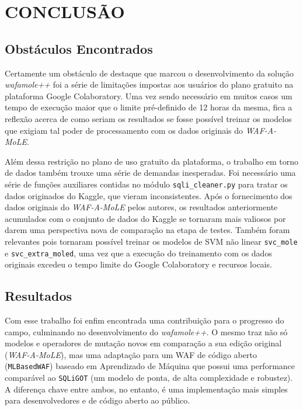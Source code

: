 \chapter{CONCLUSÃO}
\label{chp:capitulo6}

\section{Obstáculos Encontrados}

Certamente um obstáculo de destaque que marcou o desenvolvimento da solução \textit{wafamole++} foi a série de limitações impostas aos usuários do plano gratuito na plataforma Google Colaboratory. Uma vez sendo necessário em muitos casos um tempo de execução maior que o limite pré-definido de 12 horas da mesma, fica a reflexão acerca de como seriam os resultados se fosse possível treinar os modelos que exigiam tal poder de processamento com os dados originais do \textit{WAF-A-MoLE}.

Além dessa restrição no plano de uso gratuito da plataforma, o trabalho em torno de dados também trouxe uma série de demandas inesperadas. Foi necessário uma série de funções auxiliares contidas no módulo \verb+sqli_cleaner.py+ para tratar os dados originados do Kaggle, que vieram inconsistentes. Após o fornecimento dos dados originais do \textit{WAF-A-MoLE} pelos autores, os resultados anteriormente acumulados com o conjunto de dados do Kaggle se tornaram mais valiosos por darem uma perspectiva nova de comparação na etapa de testes. Também foram relevantes pois tornaram possível treinar os modelos de SVM não linear \verb+svc_mole+ e \verb+svc_extra_moled+, uma vez que a execução do treinamento com os dados originais excedeu o tempo limite do Google Colaboratory e recursos locais.

\section{Resultados}

Com esse trabalho foi enfim encontrada uma contribuição para o progresso do campo, culminando no desenvolvimento do \textit{wafamole++}. O mesmo traz não só modelos e operadores de mutação novos em comparação a sua edição original (\textit{WAF-A-MoLE}), mas uma adaptação para um WAF de código aberto (\verb+MLBasedWAF+) baseado em Aprendizado de Máquina que possui uma performance comparável ao \verb+SQLiGOT+ (um modelo de ponta, de alta complexidade e robustez). A diferença chave entre ambos, no entanto, é uma implementação mais simples para desenvolvedores e de código aberto ao público.

